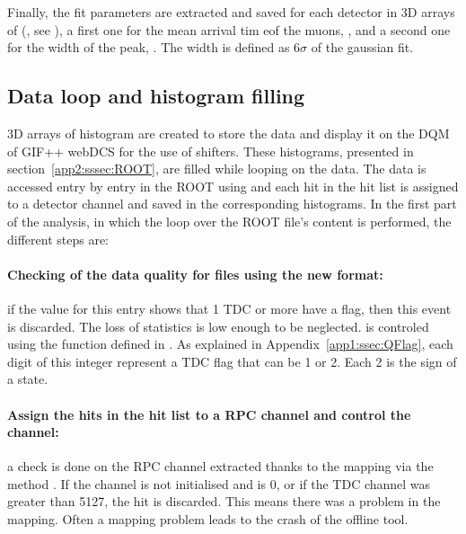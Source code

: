	Finally, the fit parameters are extracted and saved for each detector in 3D arrays of  (, see ), a first one for the mean arrival tim eof the muons, , and a second one for the width of the peak, . The width is defined as 6$\sigma$ of the gaussian fit.
	
	\subsection{Data loop and histogram filling}
	\label{app2:ssec:dataloop}
	
	3D arrays of histogram are created to store the data and display it on the DQM of GIF++ webDCS for the use of shifters. These histograms, presented in section~\ref{app2:sssec:ROOT}, are filled while looping on the data. The data is accessed entry by entry in the ROOT  using  and each hit in the hit list is assigned to a detector channel and saved in the corresponding histograms. In the first part of the analysis, in which the loop over the ROOT file's content is performed, the different steps are:
	
	\paragraph{Checking of the data quality for files using the new format:} if the  value for this entry shows that 1 TDC or more have a  flag, then this event is discarded. The loss of statistics is low enough to be neglected.  is controled using the function  defined in . As explained in Appendix~\ref{app1:ssec:QFlag}, each digit of this integer represent a TDC flag that can be 1 or 2. Each 2 is the sign of a  state.
	
	\paragraph{Assign the hits in the hit list to a RPC channel and control the channel:} a check is done on the RPC channel extracted thanks to the mapping via the method . If the channel is not initialised and is 0, or if the TDC channel was greater than 5127, the hit is discarded. This means there was a problem in the mapping. Often a mapping problem leads to the crash of the offline tool.
	
